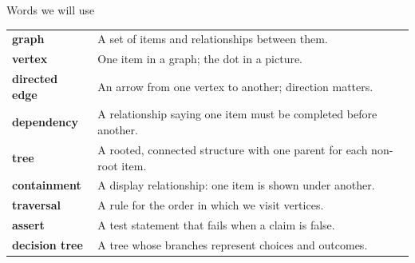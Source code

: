 \begin{frame}{Words we will use}
\small
\begin{tabular}{@{}p{3.0cm}p{9.9cm}@{}}
\textbf{graph} & A set of items and relationships between them.\\[2pt]
\textbf{vertex} & One item in a graph; the dot in a picture.\\[2pt]
\textbf{directed edge} & An arrow from one vertex to another; direction matters.\\[2pt]
\textbf{dependency} & A relationship saying one item must be completed before another.\\[2pt]
\textbf{tree} & A rooted, connected structure with one parent for each non-root item.\\[2pt]
\textbf{containment} & A display relationship: one item is shown under another.\\[2pt]
\textbf{traversal} & A rule for the order in which we visit vertices.\\[2pt]
\textbf{assert} & A test statement that fails when a claim is false.\\[2pt]
\textbf{decision tree} & A tree whose branches represent choices and outcomes.\\
\end{tabular}
\end{frame}
